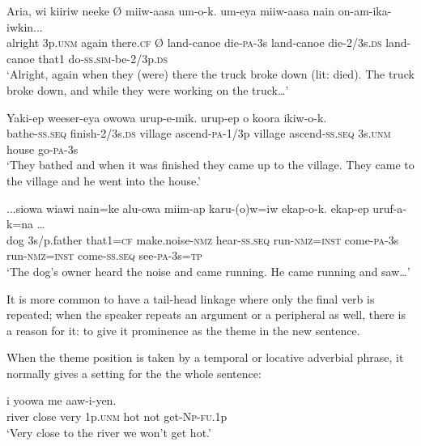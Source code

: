 \ea%
\label{ex:x1913}
\gll Aria,  wi  kiiriw  neeke  {\O}  miiw-aasa  um-o-k.   um-eya  miiw-aasa  nain  on-am-ika-iwkin... \\
alright  3p.\textsc{unm}  again  there.\textsc{cf}  {\O}  land-canoe  die-\textsc{pa}-3s land-canoe  die-2/3s.\textsc{ds}  land-canoe  that1  do-\textsc{ss}.\textsc{sim}-be-2/3p.\textsc{ds}     \\
\glt`Alright, again when they (were) there the truck broke down (lit: died). The truck broke down, and while they were working on the truck{\dots}'
\z


\ea
\gll   Yaki-ep  weeser-eya  owowa  urup-e-mik.   urup-ep  o  koora  ikiw-o-k.\\
bathe-\textsc{ss}.\textsc{seq}  finish-2/3s.\textsc{ds}  village  ascend-\textsc{pa}-1/3p  village  ascend-\textsc{ss}.\textsc{seq}  3s.\textsc{unm}  house  go-\textsc{pa}-3s\\
\glt`They bathed and when it was finished they came up to the village. They came to the village and he went into the house.'
\z



\ea%
\label{ex:x1915}
\gll ...siowa  wiawi  nain=ke  alu-owa  miim-ap karu-(o)w=iw  ekap-o-k.    ekap-ep uruf-a-k=na {\dots}\\
dog  3s/p.father  that1=\textsc{cf}  make.noise-\textsc{nmz}  hear-\textsc{ss}.\textsc{seq} run-\textsc{nmz}=\textsc{inst}  come-\textsc{pa}-3s  run-\textsc{nmz}=\textsc{inst}  come-\textsc{ss}.\textsc{seq} see-\textsc{pa}-3s=\textsc{tp}     \\
\glt`The dog's owner heard the noise and came running. He came running and saw{\dots}'
\z


It is more common to have a tail-head linkage where only the final verb is repeated; when the speaker repeats an argument or a peripheral as well, there is a reason for it: to give it prominence as the theme in the new sentence. 

When the theme position is taken by a temporal or locative adverbial phrase, it normally gives a setting for the the whole sentence:  

\ea%
\label{ex:x1699}
\gll {}    i  yoowa  me  aaw-i-yen. \\
river  close  very  1p.\textsc{unm}  hot  not  get-\textsc{Np}-\textsc{fu}.1p      \\
\glt`Very close to the river we won't get hot.'
\z



